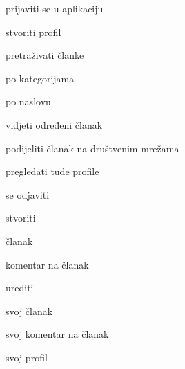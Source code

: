 \begin{packed_enum}
\item  {}

    \begin{packed_enum}

    \item prijaviti se u aplikaciju
    \item stvoriti profil
    \item pretraživati članke
        \begin{packed_enum}

        \item po kategorijama
        \item po naslovu

        \end{packed_enum}
    \item vidjeti određeni članak
    \item podijeliti članak na društvenim mrežama
    \item pregledati tuđe profile

    \end{packed_enum}

\item  {}

    \begin{packed_enum}

    \item se odjaviti
    \item stvoriti

        \begin{packed_enum}

        \item članak
        \item komentar na članak

        \end{packed_enum}

    \item urediti

        \begin{packed_enum}

        \item svoj članak
        \item svoj komentar na članak
        \item svoj profil

        \end{packed_enum}


\end{packed_enum}
\end{packed_enum}
